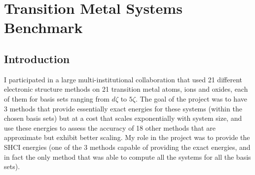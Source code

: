 \chapter{Transition Metal Systems Benchmark}
\label{ch:benchmark}
\section{Introduction}
I participated in a large multi-institutional collaboration that used 21 different electronic structure methods
on 21 transition metal atoms, ions and oxides, each of them for basis sets ranging from $d\zeta$ to $5\zeta$.
The goal of the project was to have 3 methods that provide essentially exact energies for these systems
(within the chosen basis sets) but at a cost that scales exponentially with system size, and use these
energies to assess the accuracy of 18 other methods that are approximate but exhibit better scaling.
My role in the project was to provide the SHCI energies (one of the 3 methods capable of providing the
exact energies, and in fact the only method that was able to compute all the systems for all the basis sets).

%


